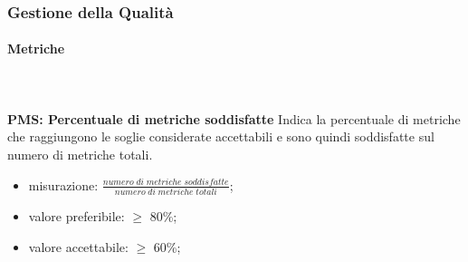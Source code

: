 		\subsubsection{Gestione della Qualità}
			\paragraph{Metriche} \mbox{} \\ \\
				\textbf{PMS: Percentuale di metriche soddisfatte} Indica la percentuale di metriche che raggiungono le soglie considerate accettabili e sono quindi soddisfatte sul numero di metriche totali.
				\begin{itemize}
					\item misurazione: $\frac{numero \; di \; metriche \; soddisfatte}{numero \; di \; metriche \; totali}$;
					\item valore preferibile: $\ge$ 80\%;
					\item valore accettabile: $\ge$ 60\%;
				\end{itemize}


		  
			
				

